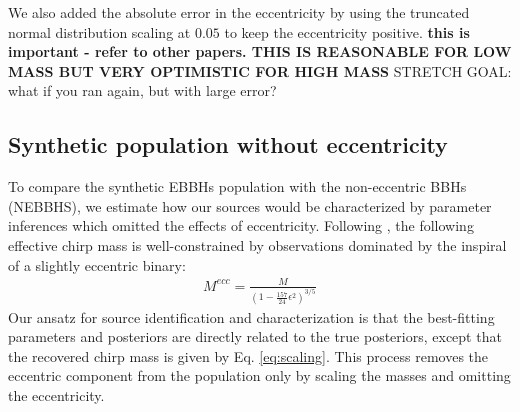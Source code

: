 \documentclass[twocolumn,prd,nofootinbib]{revtex4}
\begin{document}
We also added the absolute error in the eccentricity by using the truncated normal distribution scaling at $0.05$ to keep the eccentricity positive.
\textbf{this is important - refer to other papers.  THIS IS REASONABLE FOR LOW MASS BUT VERY OPTIMISTIC FOR HIGH MASS}
STRETCH GOAL: what if you ran again, but with large error?








\subsection{Synthetic population without eccentricity}

To compare the synthetic EBBHs population with the non-eccentric BBHs (NEBBHS), we estimate how our sources would be characterized by parameter inferences which omitted the effects of eccentricity.  Following \cite{2021_scaling_paper}, the following effective chirp mass is well-constrained by observations dominated by the inspiral of a slightly eccentric binary:
\begin{align}
\label{eq:scaling}
M^{ecc} = \frac{M}{(1-\frac{157}{24}\epsilon^2)^{3/5}}
\end{align}
%
Our ansatz for source identification and characterization is that the best-fitting parameters and posteriors are directly related to the true posteriors, except that the recovered chirp mass is given by  Eq. \ref{eq:scaling}.  This process removes the eccentric component from the population only by scaling the masses and omitting the eccentricity. 





    \label{tab:popscl_prop}
 
\end{document}
